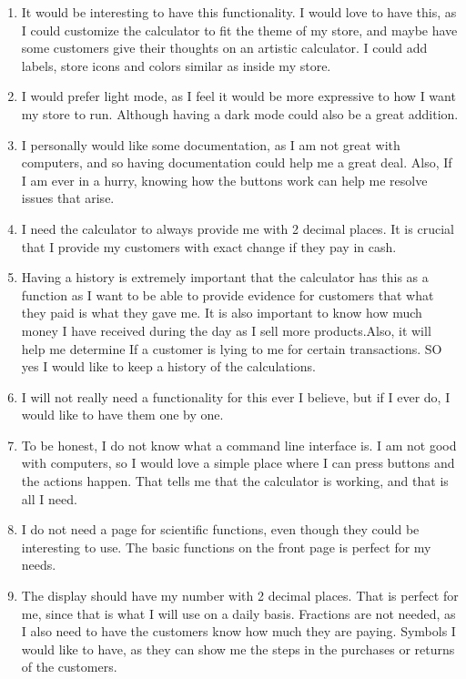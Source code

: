\documentclass[titlepage]{article}
\begin{document}
\begin{itemize}
\begin{enumerate}
                        \item It would be interesting to have this functionality. I would love to have this, as I could customize the calculator to fit the theme of my store, and maybe have some customers give their thoughts on an artistic calculator. I could add labels, store icons and colors similar as inside my store.
                        \item I would prefer light mode, as I feel it would be more expressive to how I want my store to run. Although having a dark mode could also be a great addition.
                        \item I personally would like some documentation, as I am not great with computers, and so having documentation could help me a great deal. Also, If I am ever in a hurry, knowing how the buttons work can help me resolve issues that arise.
                        \item I need the calculator to always provide me with 2 decimal places. It is crucial that I provide my customers with exact change if they pay in cash.
                        \item Having a history is extremely important that the calculator has this as a function as I want to be able to provide evidence for customers that what they paid is what they gave me. It is also important to know how much money I have received during the day as I sell more products.Also, it will help me determine If a customer is lying to me for certain transactions. SO yes I would like to keep a history of the calculations.
                        \item I will not really need a functionality for this ever I believe, but if I ever do, I would like to have them one by one.
                        \item To be honest, I do not know what a command line interface is. I am not good with computers, so I would love a simple place where I can press buttons and the actions happen. That tells me that the calculator is working, and that is all I need.
                        \item I do not need a page for scientific functions, even though they could be interesting to use. The basic functions on the front page is perfect for my needs.
                        \item The display should have my number with 2 decimal places. That is perfect for me, since that is what I will use on a daily basis. Fractions are not needed, as I also need to have the customers know how much they are paying. Symbols I would like to have, as they can show me the steps in the purchases or returns of the customers.

\end{enumerate}
\end{itemize}
\end{document}
